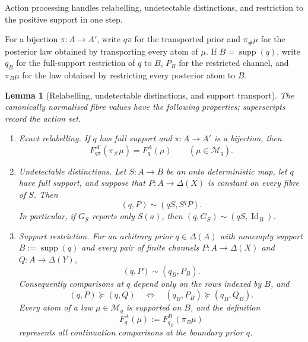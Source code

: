 \documentclass[11pt,a4paper]{article}
\newtheorem{lemma}[theorem]{Lemma}
\theoremstyle{definition}
\newcommand{\Id}{\operatorname{Id}}
\newcommand{\1}{\mathbf 1}
\begin{document}
Action processing handles relabelling, undetectable distinctions, and
restriction to the positive support in one step.

For a bijection $\pi:A\to A'$, write $q\pi$ for the transported prior and
$\pi_\#\mu$ for the posterior law obtained by transporting every atom of
$\mu$.  If $B=\operatorname{supp}(q)$, write $q_B$ for the full-support
restriction of $q$ to $B$, $P_B$ for the restricted channel, and
$\pi_B\mu$ for the law obtained by restricting every posterior atom to $B$.

\begin{lemma}[Relabelling, undetectable distinctions, and support transport]
\label{pt:lem:transport}\label{pt:lem:actionbase}\label{pt:lem:neutrality}\label{pt:lem:supprestrict}
The canonically normalised fibre values have the following properties;
superscripts record the action set.

\begin{enumerate}[label=\textup{(\alph*)},leftmargin=*]
\item \emph{Exact relabelling.}
If $q$ has full support and $\pi:A\to A'$ is a bijection, then
\begin{equation}
 F_{q\pi}^{A'}(\pi_\#\mu)=F_q^A(\mu)
 \qquad(\mu\in\mathcal M_q).
 \label{pt:eq:exact-relabel}
\end{equation}

\item \emph{Undetectable distinctions.}
Let $S:A\to B$ be an onto deterministic map, let $q$ have full support, and
suppose that $P:A\to\Delta(X)$ is constant on every fibre of $S$.  Then
\begin{equation}
 (q,P)\sim(qS,S^qP).
 \label{pt:eq:undetectable}
\end{equation}
In particular, if $G_S$ reports only $S(a)$, then
$(q,G_S)\sim(qS,\Id_B)$.

\item \emph{Support restriction.}
For an arbitrary prior $q\in\Delta(A)$ with nonempty support
$B:=\operatorname{supp}(q)$ and every pair of finite channels
$P:A\to\Delta(X)$ and $Q:A\to\Delta(Y)$,
\begin{equation}
 (q,P)\sim(q_B,P_B).
 \label{pt:eq:support-indifference}
\end{equation}
Consequently comparisons at $q$ depend only on the rows indexed by $B$, and
\begin{equation}
 (q,P)\succeq(q,Q)
 \quad\Longleftrightarrow\quad
 (q_B,P_B)\succeq(q_B,Q_B).
 \label{pt:eq:support-comparison}
\end{equation}
Every atom of a law $\mu\in\mathcal M_q$ is supported on $B$, and the
definition
\begin{equation}
 F_q^A(\mu):=F_{q_B}^{B}(\pi_B\mu)
 \label{pt:eq:boundary-representative}
\end{equation}
represents all continuation comparisons at the boundary prior $q$.
\end{enumerate}
\end{lemma}
\end{document}
